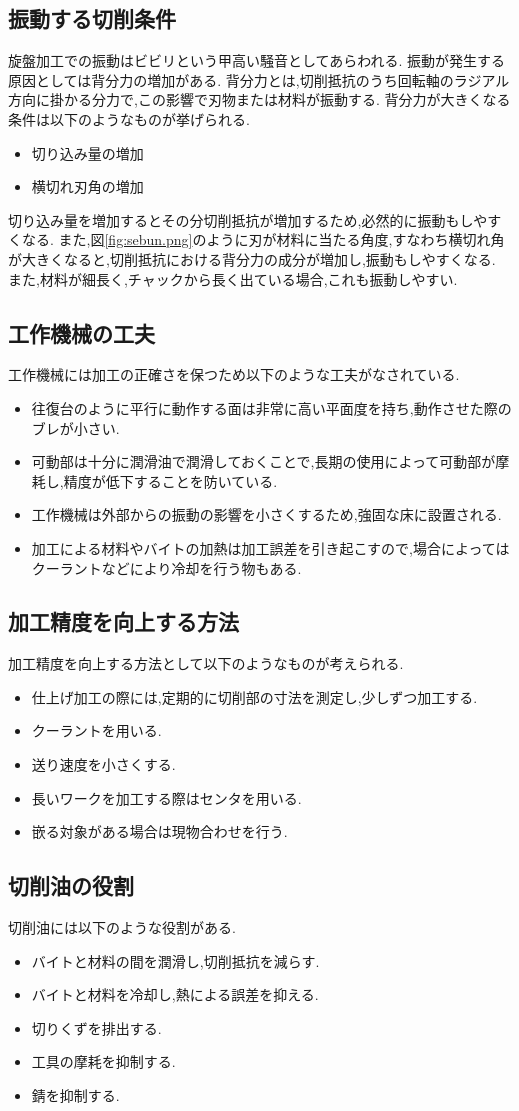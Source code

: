 \subsection{振動する切削条件}
旋盤加工での振動はビビリという甲高い騒音としてあらわれる.\cite{kuso}
振動が発生する原因としては背分力の増加がある.
背分力とは,切削抵抗のうち回転軸のラジアル方向に掛かる分力で,この影響で刃物または材料が振動する.
背分力が大きくなる条件は以下のようなものが挙げられる.
\begin{itemize}
  \item 切り込み量の増加\cite{whatis}
  \item 横切れ刃角の増加\cite{kuso}
\end{itemize}
切り込み量を増加するとその分切削抵抗が増加するため,必然的に振動もしやすくなる.\cite{whatis}
また,図\ref{fig:sebun.png}のように刃が材料に当たる角度,すなわち横切れ角が大きくなると,切削抵抗における背分力の成分が増加し,振動もしやすくなる.
また,材料が細長く,チャックから長く出ている場合,これも振動しやすい.
\subsection{工作機械の工夫}
工作機械には加工の正確さを保つため以下のような工夫がなされている.
\begin{itemize}
  \item 往復台のように平行に動作する面は非常に高い平面度を持ち,動作させた際のブレが小さい.
  \item 可動部は十分に潤滑油で潤滑しておくことで,長期の使用によって可動部が摩耗し,精度が低下することを防いている.
  \item 工作機械は外部からの振動の影響を小さくするため,強固な床に設置される.
  \item 加工による材料やバイトの加熱は加工誤差を引き起こすので,場合によってはクーラントなどにより冷却を行う物もある.
\end{itemize}
\subsection{加工精度を向上する方法}
加工精度を向上する方法として以下のようなものが考えられる.
\begin{itemize}
  \item 仕上げ加工の際には,定期的に切削部の寸法を測定し,少しずつ加工する.
  \item クーラントを用いる.
  \item 送り速度を小さくする.
  \item 長いワークを加工する際はセンタを用いる.
  \item 嵌る対象がある場合は現物合わせを行う.
\end{itemize}
\subsection{切削油の役割}
切削油には以下のような役割がある.
\begin{itemize}
  \item バイトと材料の間を潤滑し,切削抵抗を減らす.
  \item バイトと材料を冷却し,熱による誤差を抑える.
  \item 切りくずを排出する.
  \item 工具の摩耗を抑制する.
  \item 錆を抑制する.\cite{12}
\end{itemize}